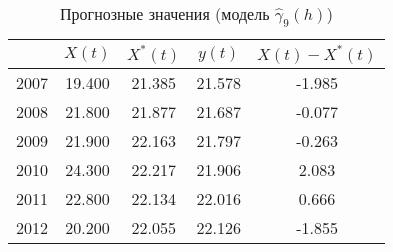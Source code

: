 \begin{table}[H]
\centering
\caption{Прогнозные значения (модель $ \widehat{\gamma}_9(h) $)} 
\label{table:auto-rob-5-prediction}
\begin{tabular}{r|cccc}
  \hline
 & $X(t)$ & $X^{*}(t)$ & $y(t)$ & $ X(t) - X^{*}(t) $ \\ 
  \hline
2007 & 19.400 & 21.385 & 21.578 & -1.985 \\ 
  2008 & 21.800 & 21.877 & 21.687 & -0.077 \\ 
  2009 & 21.900 & 22.163 & 21.797 & -0.263 \\ 
  2010 & 24.300 & 22.217 & 21.906 & 2.083 \\ 
  2011 & 22.800 & 22.134 & 22.016 & 0.666 \\ 
  2012 & 20.200 & 22.055 & 22.126 & -1.855 \\ 
   \hline
\end{tabular}
\end{table}
